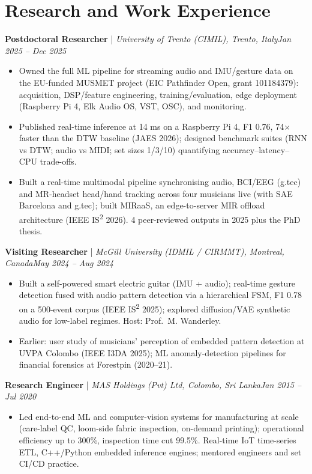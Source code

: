 \documentclass[11pt]{article}
\newenvironment{cvrole}[5]{%
  \par\noindent\textbf{\large #1} | \textit{\small #2, #3}\hfill \textit{\small #4 -- #5}\par
  \begin{itemize}[leftmargin=2em, itemsep=-0.3em, topsep=-0.5em]%
}{%
  \end{itemize}\par\noindent\mbox{}\par\vspace{0.1em}%
}
\begin{document}
\section*{Research and Work Experience}

\begin{cvrole}{Postdoctoral Researcher}{University of Trento (CIMIL)}{Trento, Italy}{Jan 2025}{Dec 2025}
    \item Owned the full ML pipeline for streaming audio and IMU/gesture data on the EU-funded MUSMET project (EIC Pathfinder Open, grant 101184379): acquisition, DSP/feature engineering, training/evaluation, edge deployment (Raspberry Pi 4, Elk Audio OS, VST, OSC), and monitoring.
    \item Published real-time inference at 14 ms on a Raspberry Pi 4, F1 0.76, 74$\times$ faster than the DTW baseline (JAES 2026); designed benchmark suites (RNN vs DTW; audio vs MIDI; set sizes 1/3/10) quantifying accuracy--latency--CPU trade-offs.
    \item Built a real-time multimodal pipeline synchronising audio, BCI/EEG (g.tec) and MR-headset head/hand tracking across four musicians live (with SAE Barcelona and g.tec); built MIRaaS, an edge-to-server MIR offload architecture (IEEE IS\textsuperscript{2} 2026). 4 peer-reviewed outputs in 2025 plus the PhD thesis.
\end{cvrole}

\begin{cvrole}{Visiting Researcher}{McGill University (IDMIL / CIRMMT)}{Montreal, Canada}{May 2024}{Aug 2024}
    \item Built a self-powered smart electric guitar (IMU + audio); real-time gesture detection fused with audio pattern detection via a hierarchical FSM, F1 0.78 on a 500-event corpus (IEEE IS\textsuperscript{2} 2025); explored diffusion/VAE synthetic audio for low-label regimes. Host: Prof.~M. Wanderley.
    \item Earlier: user study of musicians' perception of embedded pattern detection at UVPA Colombo (IEEE I3DA 2025); ML anomaly-detection pipelines for financial forensics at Forestpin (2020--21).
\end{cvrole}

\begin{cvrole}{Research Engineer}{MAS Holdings (Pvt) Ltd}{Colombo, Sri Lanka}{Jan 2015}{Jul 2020}
    \item Led end-to-end ML and computer-vision systems for manufacturing at scale (care-label QC, loom-side fabric inspection, on-demand printing); operational efficiency up to 300\%, inspection time cut 99.5\%. Real-time IoT time-series ETL, C++/Python embedded inference engines; mentored engineers and set CI/CD practice.
\end{cvrole}
\end{document}
